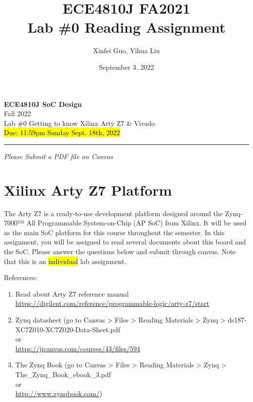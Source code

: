 \documentclass[a4paper,12pt,twoside]{article}
\author{Xinfei Guo, Yihua Liu}
\title{ECE4810J FA2021\\ \small Lab \#0 Reading Assignment}
\date{September 3, 2022}
\begin{document}
\thispagestyle{fancy}

\begin{center}
    \vspace*{0pt}
    \Large{\textbf{ECE4810J SoC Design}}\\
    \vspace*{2pt}
    \large{Fall 2022}\\
    \vspace*{10pt}
    \Large{\textcolor{caption2color}{Lab \#0 Getting to know Xilinx Arty Z7 \& Vivado}}\\
    \normalsize{\hl{Due: 11:59pm Sunday Sept. 18th, 2022}}
    \rule[-5pt]{.97\linewidth}{0.05em}
\end{center}
\begin{FlushRight}
\textit{Please Submit a PDF file on Canvas}
\end{FlushRight}

\section{Xilinx Arty Z7 Platform}
The Arty Z7 is a ready-to-use development platform designed around the Zynq-7000™ All Programmable System-on-Chip (AP SoC) from Xilinx. It will be used as the main SoC platform for this course throughout the semester. In this assignment, you will be assigned to read several documents about this board and the SoC. Please answer the questions below and submit through canvas. Note that this is an \hl{individual} lab assignment.

References:
\begin{enumerate}
    \item Read about Arty Z7 reference manual \url{https://digilent.com/reference/programmable-logic/arty-z7/start}
    \item Zynq datasheet (go to Canvas > Files > Reading Materials > Zynq > ds187-XC7Z010-XC7Z020-Data-Sheet.pdf\\or\\ \url{https://jicanvas.com/courses/43/files/594}
    \item The Zynq Book (go to Canvas > Files > Reading Materials > Zynq >\\The\_Zynq\_Book\_ebook\_3.pdf\\or\\\url{http://www.zynqbook.com/})
\end{enumerate}
\end{document}
